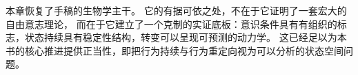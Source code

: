 \begin{summarybox}
本章恢复了手稿的生物学主干。
它的有据可依之处，不在于它证明了一套宏大的自由意志理论，
而在于它建立了一个克制的实证底板：意识条件具有有组织的标志，状态持续具有稳定性结构，转变可以呈现可预测的动力学。
这已经足以为本书的核心推进提供正当性，即把行为持续与行为重定向视为可以分析的状态空间问题。
\end{summarybox}